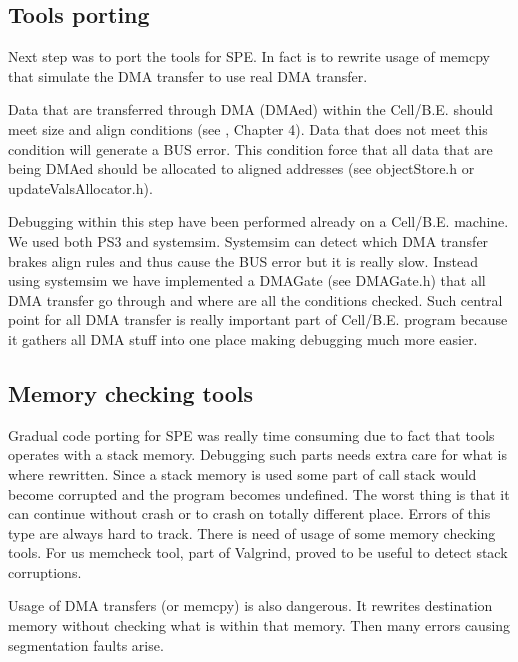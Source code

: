 \subsection{Tools porting}

\par
Next step was to port the tools for SPE.
In fact is to rewrite usage of memcpy that simulate the DMA transfer to use real DMA transfer.

\par
Data that are transferred through DMA (DMAed) within the \mbox{Cell/B.E.} should meet size and align conditions (see \cite{programmersGuide}, Chapter 4).
Data that does not meet this condition will generate a BUS error.
This condition force that all data that are being DMAed should be allocated to aligned addresses (see objectStore.h or updateValsAllocator.h).

\par
Debugging within this step have been performed already on a \mbox{Cell/B.E.} machine.
We used both PS3 and systemsim.
Systemsim can detect which DMA transfer brakes align rules and thus cause the BUS error but it is really slow.
Instead using systemsim we have implemented a DMAGate (see DMAGate.h) that all DMA transfer go through and where are all the conditions checked.
Such central point for all DMA transfer is really important part of \mbox{Cell/B.E.} program because it gathers all DMA stuff into one place making debugging much more easier.

\subsection{Memory checking tools}

\par
Gradual code porting for SPE was really time consuming due to fact that tools operates with a stack memory.
Debugging such parts needs extra care for what is where rewritten.
Since a stack memory is used some part of call stack would become corrupted and the program becomes undefined.
The worst thing is that it can continue without crash or to crash on totally different place.
Errors of this type are always hard to track.
There is need of usage of some memory checking tools.
For us memcheck tool, part of Valgrind, proved to be useful to detect stack corruptions.

\par
Usage of DMA transfers (or memcpy) is also dangerous.
It rewrites destination memory without checking what is within that memory.
Then many errors causing segmentation faults arise.

